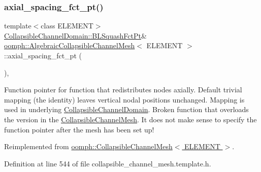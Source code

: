 \subsubsection{\texorpdfstring{axial\+\_\+spacing\+\_\+fct\+\_\+pt()}{axial\_spacing\_fct\_pt()}}
{\footnotesize\ttfamily template$<$class E\+L\+E\+M\+E\+NT$>$ \\
\hyperlink{classoomph_1_1CollapsibleChannelDomain_a2bf1d7943bfac134a5c27a54c7e1faed}{Collapsible\+Channel\+Domain\+::\+B\+L\+Squash\+Fct\+Pt}\& \hyperlink{classoomph_1_1AlgebraicCollapsibleChannelMesh}{oomph\+::\+Algebraic\+Collapsible\+Channel\+Mesh}$<$ E\+L\+E\+M\+E\+NT $>$\+::axial\+\_\+spacing\+\_\+fct\+\_\+pt (\begin{DoxyParamCaption}{ }\end{DoxyParamCaption})\hspace{0.3cm}{\ttfamily [inline]}, {\ttfamily [virtual]}}



Function pointer for function that redistributes nodes axially. Default trivial mapping (the identity) leaves vertical nodal positions unchanged. Mapping is used in underlying \hyperlink{classoomph_1_1CollapsibleChannelDomain}{Collapsible\+Channel\+Domain}. Broken function that overloads the version in the \hyperlink{classoomph_1_1CollapsibleChannelMesh}{Collapsible\+Channel\+Mesh}. It does not make sense to specify the function pointer after the mesh has been set up! 



Reimplemented from \hyperlink{classoomph_1_1CollapsibleChannelMesh_ac7913dca6b8b11240caede54414f3c11}{oomph\+::\+Collapsible\+Channel\+Mesh$<$ E\+L\+E\+M\+E\+N\+T $>$}.



Definition at line 544 of file collapsible\+\_\+channel\+\_\+mesh.\+template.\+h.

\mbox{\label{classoomph_1_1AlgebraicCollapsibleChannelMesh_abf1848b49f57419af4379a637464587d}} 
